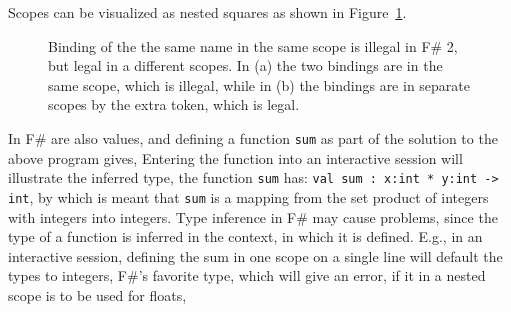 %
Scopes can be visualized as nested squares as shown in Figure~\ref{fig:scope}.
\begin{figure}
  \centering
  \caption{Binding of the the same name in the same scope is illegal in F\# 2, but legal in a different scopes. In (a) the two bindings are in the same scope, which is illegal, while in (b) the bindings are in separate scopes by the extra \token{;;} token, which is legal.}
  \label{fig:scope}
\end{figure}

In F\#  are also values, and defining a function \lstinline|sum| as part of the solution to the above program gives,
%
%
Entering the function into an interactive session will illustrate the inferred type, the function \lstinline|sum| has: \lstinline{val sum : x:int * y:int -> int}, by which is meant that \lstinline|sum| is a mapping from the set product of integers with integers into integers. Type inference in F\# may cause problems, since the type of a function is inferred in the context, in which it is defined. E.g., in an interactive session, defining the sum in one scope on a single line will default the types to integers, F\#'s favorite type, which will give an error, if it in a nested scope is to be used for floats,
%



